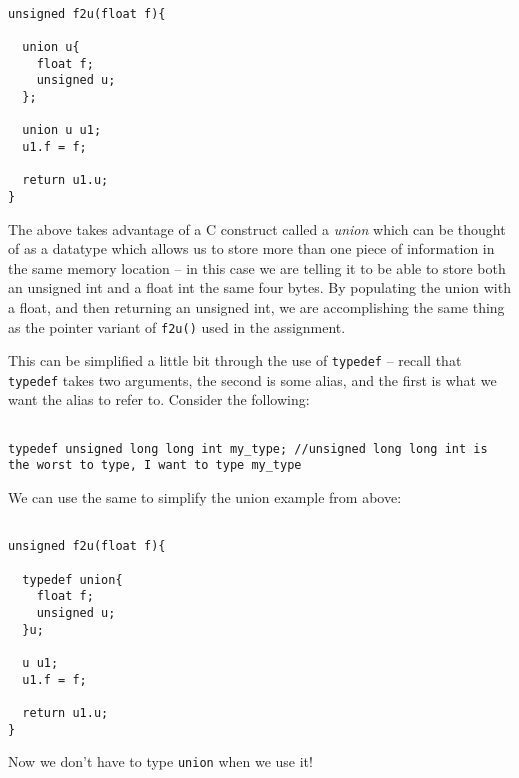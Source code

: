 \documentclass[10pt]{article}
\begin{document}
\begin{lstlisting}

unsigned f2u(float f){
  
  union u{
    float f;
    unsigned u;
  };

  union u u1;
  u1.f = f;

  return u1.u;
}
\end{lstlisting}

\noindent The above takes advantage of a C construct called a \textit{union} which can be thought of as a datatype which allows us to store more than one piece of information in the same memory location -- in this case we are telling it to be able to store both an unsigned int and a float int the same four bytes. By populating the union with a float, and then returning an unsigned int, we are accomplishing the same thing as the pointer variant of \texttt{f2u()} used in the assignment.


\noindent This can be simplified a little bit through the use of \texttt{typedef} -- recall that \texttt{typedef} takes two arguments, the second is some alias, and the first is what we want the alias to refer to. Consider the following:


\begin{lstlisting}

typedef unsigned long long int my_type; //unsigned long long int is the worst to type, I want to type my_type

\end{lstlisting}

\noindent We can use the same to simplify the union example from above:

\begin{lstlisting}

unsigned f2u(float f){
  
  typedef union{
    float f;
    unsigned u;
  }u;

  u u1;
  u1.f = f;

  return u1.u;
}

\end{lstlisting}

\noindent Now we don't have to type \texttt{union} when we use it!
\end{document}
